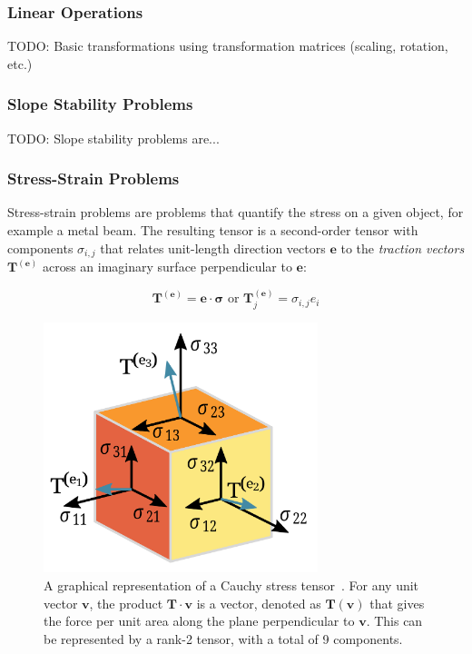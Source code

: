 \documentclass[12pt]{article}
\begin{document}
\subsubsection{Linear Operations}
TODO: Basic transformations using transformation matrices (scaling, rotation, etc.)

\subsubsection{Slope Stability Problems}
TODO: Slope stability problems are...

\subsubsection{Stress-Strain Problems}


Stress-strain problems are problems that quantify the stress on a given object,
for example a metal beam. The resulting tensor is a second-order tensor with components
$\sigma_{i,j}$ that relates unit-length direction vectors $\mathbf{e}$ to the
\textit{traction vectors} $\mathbf{T}^{(\mathbf{e})}$ across an imaginary surface
perpendicular to $\mathbf e$\citep{Wikipedia_Cauchy_2025}:

$$\mathbf{T}^{(\mathbf{e})} = \mathbf e \cdot \mathbf \sigma\text{ or }\mathbf{T}^{(\mathbf{e})}_j = \sigma_{i,j}e_i$$ 

\begin{figure}[h!]
  \includegraphics[width=8cm]{Figs/Components_stress_tensor.svg.png}
  \centering
  \caption{A graphical representation of a Cauchy stress tensor~\citep{Wikipedia_Tensors_2025}.
          For any unit vector $\mathbf{v}$, the product $\mathbf T \cdot \mathbf v$ 
          is a vector, denoted as $\mathbf T (\mathbf v)$ that gives the force
          per unit area along the plane perpendicular to $\mathbf v$.
          This can be represented by a rank-2 tensor,
          with a total of 9 components.}
\end{figure}
\end{document}
